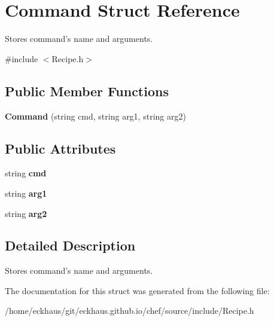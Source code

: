 \hypertarget{structCommand}{\section{Command Struct Reference}
\label{structCommand}
}


Stores command's name and arguments.  




{\ttfamily \#include $<$Recipe.\-h$>$}

\subsection*{Public Member Functions}
\begin{DoxyCompactItemize}
\item 
\hypertarget{structCommand_ad5baf9209de07797e8f6525a8d8b5eee}{{\bfseries Command} (string cmd, string arg1, string arg2)}\label{structCommand_ad5baf9209de07797e8f6525a8d8b5eee}

\end{DoxyCompactItemize}
\subsection*{Public Attributes}
\begin{DoxyCompactItemize}
\item 
\hypertarget{structCommand_aff4def5cb9cabcb8b719ccb472c527f5}{string {\bfseries cmd}}\label{structCommand_aff4def5cb9cabcb8b719ccb472c527f5}

\item 
\hypertarget{structCommand_af859040272fe89b1640db987bf06d535}{string {\bfseries arg1}}\label{structCommand_af859040272fe89b1640db987bf06d535}

\item 
\hypertarget{structCommand_a415cd7a04e524df881e49d35cf0d5d09}{string {\bfseries arg2}}\label{structCommand_a415cd7a04e524df881e49d35cf0d5d09}

\end{DoxyCompactItemize}


\subsection{Detailed Description}
Stores command's name and arguments. 

The documentation for this struct was generated from the following file\-:\begin{DoxyCompactItemize}
\item 
/home/eckhaus/git/eckhaus.\-github.\-io/chef/source/include/Recipe.\-h\end{DoxyCompactItemize}
